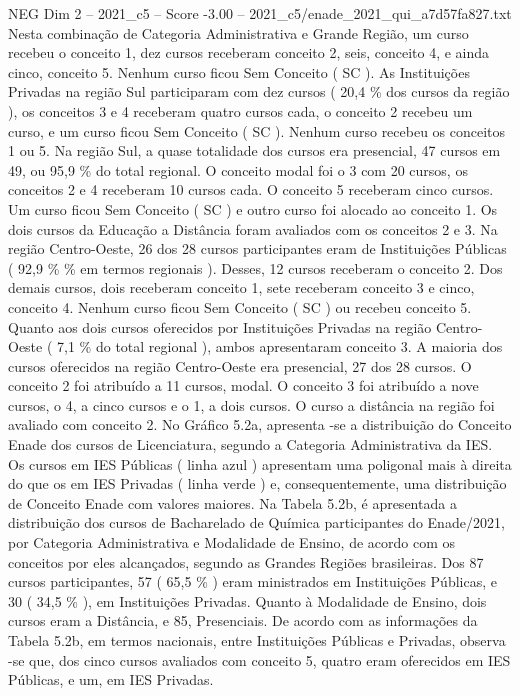 \begin{textsample}{NEG Dim 2 – 2021\_c5 – Score -3.00 – 2021\_c5/enade\_2021\_qui\_a7d57fa827.txt}
Nesta combinação de Categoria Administrativa e Grande Região, um curso recebeu o conceito 1, dez cursos receberam conceito 2, seis, conceito 4, e ainda cinco, conceito 5.
Nenhum curso ficou Sem Conceito ( SC ).
As Instituições Privadas na região Sul participaram com dez cursos ( 20,4 \% dos cursos da região ), os conceitos 3 e 4 receberam quatro cursos cada, o conceito 2 recebeu um curso, e um curso ficou Sem Conceito ( SC ).
Nenhum curso recebeu os conceitos 1 ou 5.
Na região Sul, a quase totalidade dos cursos era presencial, 47 cursos em 49, ou 95,9 \% do total regional.
O conceito modal foi o 3 com 20 cursos, os conceitos 2 e 4 receberam 10 cursos cada.
O conceito 5 receberam cinco cursos.
Um curso ficou Sem Conceito ( SC ) e outro curso foi alocado ao conceito 1.
Os dois cursos da Educação a Distância foram avaliados com os conceitos 2 e 3.
Na região Centro-Oeste, 26 dos 28 cursos participantes eram de Instituições Públicas ( 92,9 \% \% em termos regionais ).
Desses, 12 cursos receberam o conceito 2.
Dos demais cursos, dois receberam conceito 1, sete receberam conceito 3 e cinco, conceito 4.
Nenhum curso ficou Sem Conceito ( SC ) ou recebeu conceito 5.
Quanto aos dois cursos oferecidos por Instituições Privadas na região Centro-Oeste ( 7,1 \% do total regional ), ambos apresentaram conceito 3.
A maioria dos cursos oferecidos na região Centro-Oeste era presencial, 27 dos 28 cursos.
O conceito 2 foi atribuído a 11 cursos, modal.
O conceito 3 foi atribuído a nove cursos, o 4, a cinco cursos e o 1, a dois cursos.
O curso a distância na região foi avaliado com conceito 2.
No Gráfico 5.2a, apresenta -se a distribuição do Conceito Enade dos cursos de Licenciatura, segundo a Categoria Administrativa da IES.
Os cursos em IES Públicas ( linha azul ) apresentam uma poligonal mais à direita do que os em IES Privadas ( linha verde ) e, consequentemente, uma distribuição de Conceito Enade com valores maiores.
Na Tabela 5.2b, é apresentada a distribuição dos cursos de Bacharelado de Química participantes do Enade/2021, por Categoria Administrativa e Modalidade de Ensino, de acordo com os conceitos por eles alcançados, segundo as Grandes Regiões brasileiras.
Dos 87 cursos participantes, 57 ( 65,5 \% ) eram ministrados em Instituições Públicas, e 30 ( 34,5 \% ), em Instituições Privadas.
Quanto à Modalidade de Ensino, dois cursos eram a Distância, e 85, Presenciais.
De acordo com as informações da Tabela 5.2b, em termos nacionais, entre Instituições Públicas e Privadas, observa -se que, dos cinco cursos avaliados com conceito 5, quatro eram oferecidos em IES Públicas, e um, em IES Privadas.

\end{textsample}

